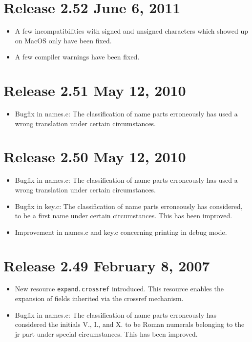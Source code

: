 \documentclass[11pt,a4paper]{scrartcl}
\newcommand\rsc[1]{\texttt{#1}}
\newcommand\File[1]{\textsf{#1}}
\newenvironment{Release}[2]{%
  \def\tmp{#2}%
  \section*{Release #1 \ifx\tmp\empty\else{\normalsize[#2]}\fi}
  \begin{itemize}
}{\end{itemize}}
\newenvironment{Fix}[1]{\item }{}
\newenvironment{New}[1]{\item }{}
\begin{document}
\begin{multicols}
 \begin{Release}{2.52}{June 6, 2011}
  \begin{Fix}{gene}
    A few incompatibilities with signed and unsigned characters which
    showed up on MacOS only have been fixed.
  \end{Fix}
  \begin{Fix}{gene}
    A few compiler warnings have been fixed.
  \end{Fix}
 \end{Release}

 \begin{Release}{2.51}{May 12, 2010}
  \begin{Fix}{gene}
    Bugfix in \File{names.c}: The classification of name parts
    erroneously has used a wrong translation under certain circumstances.
  \end{Fix}
 \end{Release}

 \begin{Release}{2.50}{May 12, 2010}
  \begin{Fix}{gene}
    Bugfix in \File{names.c}: The classification of name parts
    erroneously has used a wrong translation under certain
    circumstances.
  \end{Fix}
  \begin{Fix}{gene}
    Bugfix in \File{key.c}: The classification of name parts
    erroneously has considered, to be a first name under certain
    circumstances. This has been improved.
  \end{Fix}
  \begin{Fix}{gene}
    Improvement in \File{names.c} and \File{key.c} concerning printing in
    debug mode.
  \end{Fix}
 \end{Release}

 \begin{Release}{2.49}{February 8, 2007}
  \begin{New}{gene}
    New resource \rsc{expand.crossref} introduced. This resource
    enables the expansion of fields inherited via the crossref
    mechanism.
  \end{New}
  \begin{Fix}{gene}
    Bugfix in \File{names.c}: The classification of name parts
    erroneously has considered the initials V., I., and X. to be Roman
    numerals belonging to the jr part under special circumstances.
    This has been improved.
  \end{Fix}


\end{Release}
\end{multicols}
\end{document}
